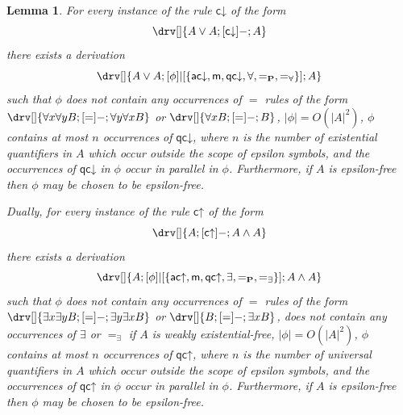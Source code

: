 \documentclass[10pt]{article}
\newtheorem{lemma}[theorem]{Lemma}
\theoremstyle{definition}\newtheorem{remark}[theorem]{Remark}
\theoremstyle{definition}\newtheorem{example}[theorem]{Example}
\theoremstyle{definition}\newtheorem{definition}[theorem]{Definition}
\newcommand{\acUp}{{\mathsf{ac\mathord\uparrow}}}
\newcommand{\acDown}{{\mathsf{ac\mathord\downarrow}}}
\newcommand{\cUp}{{\mathsf{c\mathord\uparrow}}}
\newcommand{\cDown}{{\mathsf{c\mathord\downarrow}}}
\newcommand{\medial}{{\mathsf{m}}}
\newcommand{\qcUp}{{\mathsf{qc\mathord\uparrow}}}
\newcommand{\qcDown}{{\mathsf{qc\mathord\downarrow}}}
\newcommand{\eqProp}{=_{\textbf{P}}}
\newcommand{\eqExists}{=_{\exists}}
\newcommand{\eqForall}{=_{\forall}}
\begin{document}
	\begin{lemma}\label{ContractionDecomposition}
		For every instance of the rule $\cDown$ of the form
		\[
		\drv[] {
			A \lor A ; [\cDown]- ; A
		}
		\]
		there exists a derivation
		\[
		\drv[] {
			A \lor A ; [\phi]|[\{\acDown, \medial, \qcDown, \forall, \eqProp, \eqForall\}] ; A
		}
		\]
		such that $\phi$ does not contain any occurrences of $=$ rules of the form $\drv[] {\forall x \forall y B ; [=]- ; \forall y \forall x B}$ or $\drv[] {\forall x B ; [=]- ; B}$, $| \phi | = O(| A |^2)$, $\phi$ contains at most $n$ occurrences of $\qcDown$, where $n$ is the number of existential quantifiers in $A$ which occur outside the scope of epsilon symbols, and the occurrences of $\qcDown$ in $\phi$ occur in parallel in $\phi$. Furthermore, if $A$ is epsilon-free then $\phi$ may be chosen to be epsilon-free.
		
		Dually, for every instance of the rule $\cUp$ of the form
		\[
		\drv[] {
			A ; [\cUp]- ; A \land A
		}
		\]
		there exists a derivation
		\[
		\drv[] {
			A ; [\phi]|[\{\acUp, \medial, \qcUp, \exists, \eqProp, \eqExists\}] ; A \land A
		}
		\]
		such that $\phi$ does not contain any occurrences of $=$ rules of the form $\drv[] {\exists x \exists y B ; [=]- ; \exists y \exists x B}$ or $\drv[] {B ; [=]- ; \exists x B}$, does not contain any occurrences of $\exists$ or $\eqExists$ if $A$ is weakly existential-free, $| \phi | = O(| A |^2)$, $\phi$ contains at most $n$ occurrences of $\qcUp$, where $n$ is the number of universal quantifiers in $A$ which occur outside the scope of epsilon symbols, and the occurrences of $\qcUp$ in $\phi$ occur in parallel in $\phi$. Furthermore, if $A$ is epsilon-free then $\phi$ may be chosen to be epsilon-free.
	\end{lemma}
	
\end{document}
